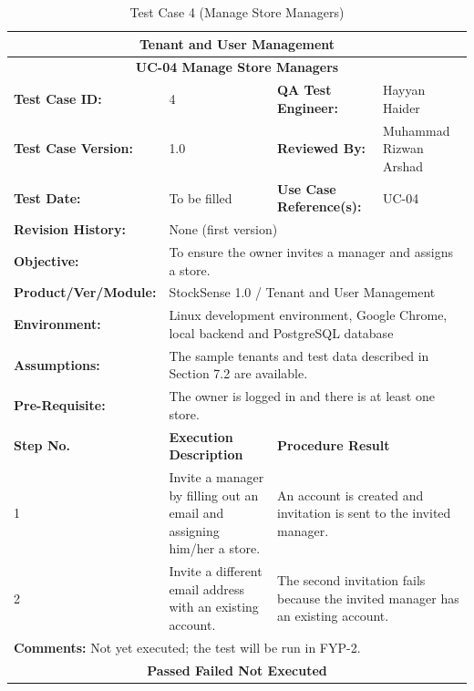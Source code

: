 \documentclass{StockSense}
\begin{document}
\begin{table}[!htbp]
\centering
\caption{Test Case 4 (Manage Store Managers)}
{\small\linespread{1}\selectfont\renewcommand{\arraystretch}{1.25}
\begin{tabular}{|p{}|p{}|p{}|p{}|}
\hline
\multicolumn{4}{|c|}{\textbf{Tenant and User Management}} \\ \hline
\multicolumn{4}{|c|}{\textbf{UC-04 Manage Store Managers}} \\ \hline
\textbf{Test Case ID:} & 4 & \textbf{QA Test Engineer:} & Hayyan Haider \\ \hline
\textbf{Test Case Version:} & 1.0 & \textbf{Reviewed By:} & Muhammad Rizwan Arshad \\ \hline
\textbf{Test Date:} & To be filled & \textbf{Use Case Reference(s):} & UC-04 \\ \hline
\textbf{Revision History:} & \multicolumn{3}{p{\dimexpr0.70\textwidth+4\tabcolsep\relax}|}{None (first version)} \\ \hline
\textbf{Objective:} & \multicolumn{3}{p{\dimexpr0.70\textwidth+4\tabcolsep\relax}|}{To ensure the owner invites a manager and assigns a store.} \\ \hline
\textbf{Product/Ver/Module:} & \multicolumn{3}{p{\dimexpr0.70\textwidth+4\tabcolsep\relax}|}{StockSense 1.0 / Tenant and User Management} \\ \hline
\textbf{Environment:} & \multicolumn{3}{p{\dimexpr0.70\textwidth+4\tabcolsep\relax}|}{Linux development environment, Google Chrome, local backend and PostgreSQL database} \\ \hline
\textbf{Assumptions:} & \multicolumn{3}{p{\dimexpr0.70\textwidth+4\tabcolsep\relax}|}{The sample tenants and test data described in Section 7.2 are available.} \\ \hline
\textbf{Pre-Requisite:} & \multicolumn{3}{p{\dimexpr0.70\textwidth+4\tabcolsep\relax}|}{The owner is logged in and there is at least one store.} \\ \hline
\textbf{Step No.} & \textbf{Execution Description} & \multicolumn{2}{l|}{\textbf{Procedure Result}} \\ \hline
1 & Invite a manager by filling out an email and assigning him/her a store. & \multicolumn{2}{p{\dimexpr0.42\textwidth+2\tabcolsep\relax}|}{An account is created and invitation is sent to the invited manager.} \\ \hline
2 & Invite a different email address with an existing account. & \multicolumn{2}{p{\dimexpr0.42\textwidth+2\tabcolsep\relax}|}{The second invitation fails because the invited manager has an existing account.} \\ \hline
\multicolumn{4}{|l|}{\textbf{Comments:} Not yet executed; the test will be run in FYP-2.} \\ \hline
\multicolumn{4}{|c|}{\textbf{Passed \quad Failed \quad Not Executed}} \\ \hline
\end{tabular}\par}
\end{table}
\end{document}
